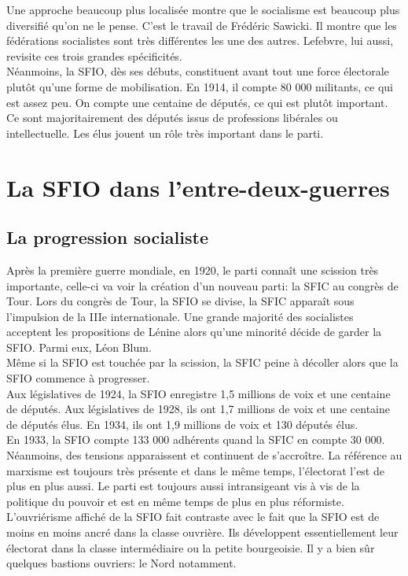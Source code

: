 \documentclass[10pt, a4paper, openany]{book}
\begin{document}
Une approche beaucoup plus localisée montre que le socialisme est beaucoup plus diversifié qu'on ne le pense. C'est le travail de Frédéric Sawicki. Il montre que les fédérations socialistes sont très différentes les une des autres. Lefebvre, lui aussi, revisite ces trois grandes spécificités. \\
Néanmoins, la SFIO, dès ses débuts, constituent avant tout une force électorale plutôt qu'une forme de mobilisation. En 1914, il compte 80 000 militants, ce qui est assez peu. On compte une centaine de députés, ce qui est plutôt important. Ce sont majoritairement des députés issus de professions libérales ou intellectuelle. Les élus jouent un rôle très important dans le parti. 

\section{La SFIO dans l'entre-deux-guerres}

\subsection{La progression socialiste}

Après la première guerre mondiale, en 1920, le parti connaît une scission très importante, celle-ci va voir la création d'un nouveau parti: la SFIC au congrès de Tour. Lors du congrès de Tour, la SFIO se divise, la SFIC apparaît sous l'impulsion de la IIIe internationale. Une grande majorité des socialistes acceptent les propositions de Lénine alors qu'une minorité décide de garder la SFIO. Parmi eux, Léon Blum. \\
Même si la SFIO est touchée par la scission, la SFIC peine à décoller alors que la SFIO commence à progresser. \\
Aux législatives de 1924, la SFIO enregistre 1,5 millions de voix et une centaine de députés. Aux législatives de 1928, ils ont 1,7 millions de voix et une centaine de députés élus. En 1934, ils ont 1,9 millions de voix et 130 députés élus. \\
En 1933, la SFIO compte 133 000 adhérents quand la SFIC en compte 30 000. Néanmoins, des tensions apparaissent et continuent de s'accroître. La référence au marxisme est toujours très présente et dans le même temps, l'électorat l'est de plus en plus aussi. Le parti est toujours aussi intransigeant vis à vis de la politique du pouvoir et est en même temps de plus en plus réformiste. L'ouvriérisme affiché de la SFIO fait contraste avec le fait que la SFIO est de moins en moins ancré dans la classe ouvrière. Ils développent essentiellement leur électorat dans la classe intermédiaire ou la petite bourgeoisie. Il y a bien sûr quelques bastions ouvriers: le Nord notamment.
\end{document}
